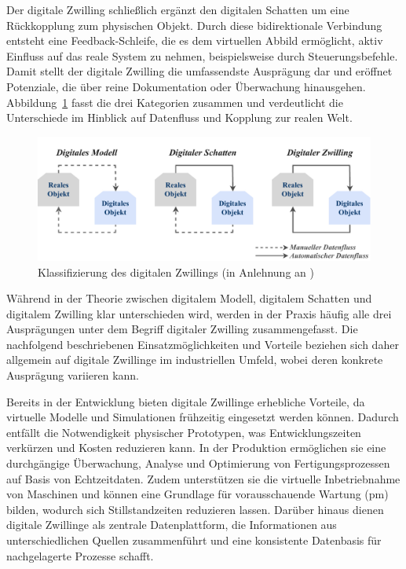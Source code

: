 Der digitale Zwilling schließlich ergänzt den digitalen Schatten um eine Rückkopplung zum physischen Objekt. 
Durch diese bidirektionale Verbindung entsteht eine Feedback-Schleife, die es dem virtuellen Abbild ermöglicht, aktiv Einfluss auf das reale System zu nehmen, beispielsweise durch Steuerungsbefehle.
Damit stellt der digitale Zwilling die umfassendste Ausprägung dar und eröffnet Potenziale, die über reine Dokumentation oder Überwachung hinausgehen.
Abbildung~\ref{fig:klassifizierungDT} fasst die drei Kategorien zusammen und verdeutlicht die Unterschiede im Hinblick auf Datenfluss und Kopplung zur realen Welt.

\begin{figure}[htbp]
    \centering
    \includegraphics[width=1\textwidth]{Bilder/klassifizierung_DT.pdf}
    \caption[Klassifizierung des digitalen Zwillings]{Klassifizierung des digitalen Zwillings (in Anlehnung an \cite{ClassificationDT})}
    \label{fig:klassifizierungDT}
\end{figure}
\vspace{-0.5em}

\newpage
Während in der Theorie zwischen digitalem Modell, digitalem Schatten und digitalem Zwilling klar unterschieden wird, werden in der Praxis häufig alle drei Ausprägungen unter dem Begriff digitaler Zwilling zusammengefasst.
Die nachfolgend beschriebenen Einsatzmöglichkeiten und Vorteile beziehen sich daher allgemein auf digitale Zwillinge im industriellen Umfeld, wobei deren konkrete Ausprägung variieren kann.

Bereits in der Entwicklung bieten digitale Zwillinge erhebliche Vorteile, da virtuelle Modelle und Simulationen frühzeitig eingesetzt werden können. 
Dadurch entfällt die Notwendigkeit physischer Prototypen, was Entwicklungszeiten verkürzen und Kosten reduzieren kann. 
In der Produktion ermöglichen sie eine durchgängige Überwachung, Analyse und Optimierung von Fertigungsprozessen auf Basis von Echtzeitdaten. 
Zudem unterstützen sie die virtuelle Inbetriebnahme von Maschinen und können eine Grundlage für vorausschauende Wartung (\ac{pm}) bilden, wodurch sich Stillstandzeiten reduzieren lassen.
Darüber hinaus dienen digitale Zwillinge als zentrale Datenplattform, die Informationen aus unterschiedlichen Quellen zusammenführt und eine konsistente Datenbasis für nachgelagerte Prozesse schafft. \cite{DTForSmartManufacturing}


